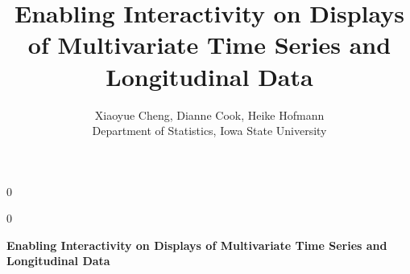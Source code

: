 \documentclass[12pt]{article}
\newcommand{\blind}{0}
\begin{document}
\def\spacingset#1{\renewcommand{\baselinestretch}%
{#1}\small\normalsize} \spacingset{1}


\blind
{
  \title{\bf  Enabling Interactivity on Displays of Multivariate Time Series and Longitudinal Data}
  \author{Xiaoyue Cheng,
    Dianne Cook, Heike Hofmann \\
    Department of Statistics, Iowa State University
    }
\date{}
  \maketitle
} \fi

\blind
{
  \bigskip
  \bigskip
  \bigskip
  \begin{center}
    {\LARGE\bf Enabling Interactivity on Displays of Multivariate Time Series and Longitudinal Data}
\end{center}
  \medskip
} \fi
\end{document}
